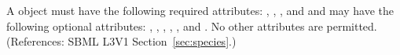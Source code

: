 A \Species object must have the following required attributes: 
, , ,
 and 
and may have the following optional attributes:
, , , ,
,  and 
.  No other attributes are permitted.  
(References: SBML L3V1 Section~\ref{sec:species}.)
